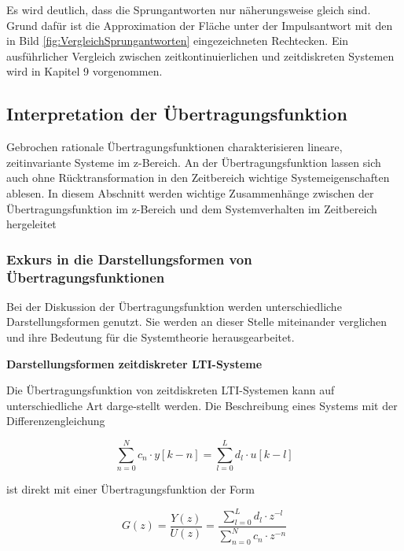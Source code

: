 \noindent Es wird deutlich, dass die Sprungantworten nur n\"{a}herungsweise gleich sind. Grund daf\"{u}r ist die Approximation der Fl\"{a}che unter der Impulsantwort mit den in Bild \ref{fig:VergleichSprungantworten} eingezeichneten Rechtecken. Ein ausf\"{u}hrlicher Vergleich zwischen zeitkontinuierlichen und zeitdiskreten Systemen wird in Kapitel 9 vorgenommen. 

\clearpage

\subsection{Interpretation der \"{U}bertragungsfunktion}

\noindent Gebrochen rationale \"{U}bertragungsfunktionen charakterisieren lineare, zeitinvariante Systeme im z-Bereich. An der \"{U}bertragungsfunktion lassen sich auch ohne R\"{u}cktransformation in den Zeitbereich wichtige Systemeigenschaften ablesen. In diesem Abschnitt werden wichtige Zusammenh\"{a}nge zwischen der \"{U}bertragungsfunktion im z-Bereich und dem Systemverhalten im Zeitbereich hergeleitet 

\subsubsection{Exkurs in die Darstellungsformen von \"{U}bertragungsfunktionen}

\noindent Bei der Diskussion der \"{U}bertragungsfunktion werden unterschiedliche Darstellungsformen genutzt. Sie werden an dieser Stelle miteinander verglichen und ihre Bedeutung f\"{u}r die Systemtheorie herausgearbeitet.\bigskip

{\selectfont
\noindent\textbf{Darstellungsformen zeitdiskreter LTI-Systeme}}\smallskip

\noindent Die Übertragungsfunktion von zeitdiskreten LTI-Systemen kann auf unterschiedliche Art darge-stellt werden. Die Beschreibung eines Systems mit der Differenzengleichung 

\begin{equation}\label{eq:sixfifty}
\sum _{n=0}^{N}c_{n} \cdot y\left[k-n\right] =\sum _{l=0}^{L}d_{l} \cdot u\left[k-l\right]
\end{equation}

\noindent ist direkt mit einer \"{U}bertragungsfunktion der Form 

\begin{equation}\label{eq:sixfiftyone}
G\left(z\right)=\frac{Y\left(z\right)}{U\left(z\right)} =\frac{\sum _{l=0}^{L}d_{l} \cdot z^{-l}  }{\sum _{n=0}^{N}c_{n} \cdot z^{-n}  }    
\end{equation}

